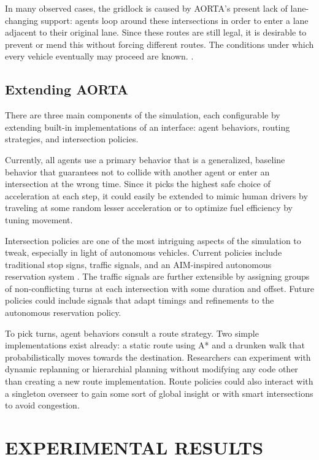 \documentclass[letterpaper, 10 pt, conference]{ieeeconf}  %
\begin{document}
In many observed cases, the gridlock is caused by AORTA's present lack of
lane-changing support: agents loop around these intersections in order to enter
a lane adjacent to their original lane. Since these routes are still legal, it
is desirable to prevent or mend this without forcing different routes. The
conditions under which every vehicle eventually may proceed are known.
\cite{AAAI11-au}.

\subsection{Extending AORTA}
\label{sec:config}

There are three main components of the simulation, each configurable by
extending built-in implementations of an interface: agent behaviors, routing
strategies, and intersection policies.

Currently, all agents use a primary behavior that is a generalized, baseline
behavior that guarantees not to collide with another agent or enter an
intersection at the wrong time. Since it picks the highest safe choice of
acceleration at each step, it could easily be extended to mimic human drivers by
traveling at some random lesser acceleration or to optimize fuel efficiency
by tuning movement.

Intersection policies are one of the most intriguing aspects of the simulation
to tweak, especially in light of autonomous vehicles. Current policies include
traditional stop signs, traffic signals, and an AIM-inspired autonomous
reservation system \cite{JAIR08-dresner}. The traffic signals are further
extensible by assigning groups of non-conflicting turns at each intersection
with some duration and offset. Future policies could include signals that adapt
timings and refinements to the autonomous reservation policy.

To pick turns, agent behaviors consult a route strategy. Two simple
implementations exist already: a static route using A* \cite{astar} and a
drunken walk that probabilistically moves towards the destination.  Researchers
can experiment with dynamic replanning or hierarchial planning without modifying
any code other than creating a new route implementation. Route policies could
also interact with a singleton overseer to gain some sort of global insight or
with smart intersections to avoid congestion.


\section{EXPERIMENTAL RESULTS}
\label{sec:results}
\end{document}
